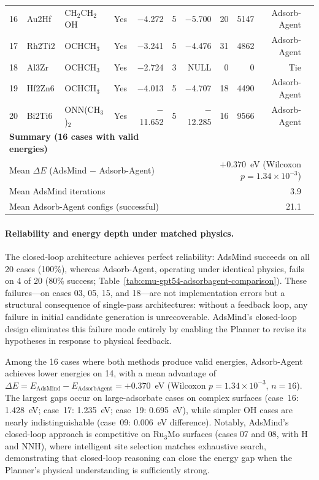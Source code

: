 \begin{table}[t]
{\begin{tabular}{llllrrrrrrr}
16 & Au2Hf & CH$_2$CH$_2$OH & Yes & $-$4.272 & 5 & $-$5.700 & 20 & 5147 & Adsorb-Agent \\
17 & Rh2Ti2 & OCHCH$_3$ & Yes & $-$3.241 & 5 & $-$4.476 & 31 & 4862 & Adsorb-Agent \\
18 & Al3Zr & OCHCH$_3$ & Yes & $-$2.724 & 3 & NULL & 0 & 0 & Tie \\
19 & Hf2Zn6 & OCHCH$_3$ & Yes & $-$4.013 & 5 & $-$4.707 & 18 & 4490 & Adsorb-Agent \\
20 & Bi2Ti6 & ONN(CH$_3$)$_2$ & Yes & $-$11.652 & 5 & $-$12.285 & 16 & 9566 & Adsorb-Agent \\
\hline
\multicolumn{5}{l}{\textbf{Summary (16 cases with valid energies)}} & & & & & \\
\multicolumn{5}{l}{Mean $\Delta E$ (AdsMind $-$ Adsorb-Agent)} & \multicolumn{5}{r}{$+0.370$~eV (Wilcoxon $p = 1.34 \times 10^{-3}$)} \\
\multicolumn{5}{l}{Mean AdsMind iterations} & \multicolumn{5}{r}{3.9} \\
\multicolumn{5}{l}{Mean Adsorb-Agent configs (successful)} & \multicolumn{5}{r}{21.1} \\
\end{tabular}%
}
\end{table}

\paragraph{Reliability and energy depth under matched physics.}
The closed-loop architecture achieves perfect reliability: AdsMind succeeds on all 20 cases (100\%), whereas Adsorb-Agent, operating under identical physics, fails on 4 of 20 (80\% success; Table~\ref{tab:cmu-gpt54-adsorbagent-comparison}).
These failures---on cases 03, 05, 15, and 18---are not implementation errors but a structural consequence of single-pass architectures: without a feedback loop, any failure in initial candidate generation is unrecoverable.
AdsMind's closed-loop design eliminates this failure mode entirely by enabling the Planner to revise its hypotheses in response to physical feedback.

Among the 16 cases where both methods produce valid energies, Adsorb-Agent achieves lower energies on 14, with a mean advantage of $\Delta E = E_{\mathrm{AdsMind}} - E_{\mathrm{AdsorbAgent}} = +0.370$~eV (Wilcoxon $p = 1.34 \times 10^{-3}$, $n = 16$).
The largest gaps occur on large-adsorbate cases on complex surfaces (case~16: 1.428~eV; case~17: 1.235~eV; case~19: 0.695~eV), while simpler OH cases are nearly indistinguishable (case~09: 0.006~eV difference).
Notably, AdsMind's closed-loop approach is competitive on Ru$_3$Mo surfaces (cases 07 and 08, with H and NNH), where intelligent site selection matches exhaustive search, demonstrating that closed-loop reasoning can close the energy gap when the Planner's physical understanding is sufficiently strong.

